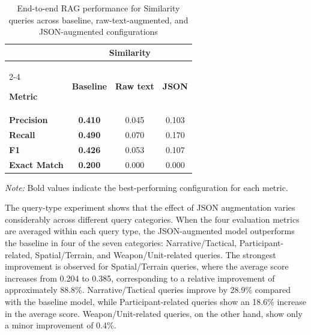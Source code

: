 \begin{table}[H]
    \centering
    \caption{End-to-end RAG performance for Similarity queries across baseline, raw-text-augmented, and JSON-augmented configurations}
    \label{tab:e2e_similarity}

    \small
    \renewcommand{\arraystretch}{1.4}
    \setlength{\tabcolsep}{12pt}

    \begin{tabular}{l ccc}
        \toprule
        & \multicolumn{3}{c}{\textbf{Similarity}} \\
        \cmidrule(lr){2-4}

        \textbf{Metric} &
        \textbf{Baseline} &
        \textbf{Raw text} &
        \textbf{JSON} \\
        \midrule

        \textbf{Precision} &
        \textbf{0.410} & 0.045 & 0.103 \\

        \textbf{Recall} &
        \textbf{0.490} & 0.070 & 0.170 \\

        \textbf{F1} &
        \textbf{0.426} & 0.053 & 0.107 \\

        \textbf{Exact Match} &
        \textbf{0.200} & 0.000 & 0.000 \\

        \bottomrule
    \end{tabular}

    \par\vspace{4pt}
    \begin{minipage}{0.85\textwidth}
        \footnotesize
        \textit{Note:} Bold values indicate the
        best-performing configuration for each metric.
    \end{minipage}

\end{table}
The query-type experiment shows that the effect of JSON augmentation varies considerably across different query categories. When the four evaluation metrics are averaged within each query type, the JSON-augmented model outperforms the baseline in four of the seven categories: Narrative/Tactical, Participant-related, Spatial/Terrain, and Weapon/Unit-related queries. The strongest improvement is observed for Spatial/Terrain queries, where the average score increases from 0.204 to 0.385, corresponding to a relative improvement of approximately 88.8\%. Narrative/Tactical queries improve by 28.9\% compared with the baseline model, while Participant-related queries show an 18.6\% increase in the average score. Weapon/Unit-related queries, on the other hand, show only a minor improvement of 0.4\%.

